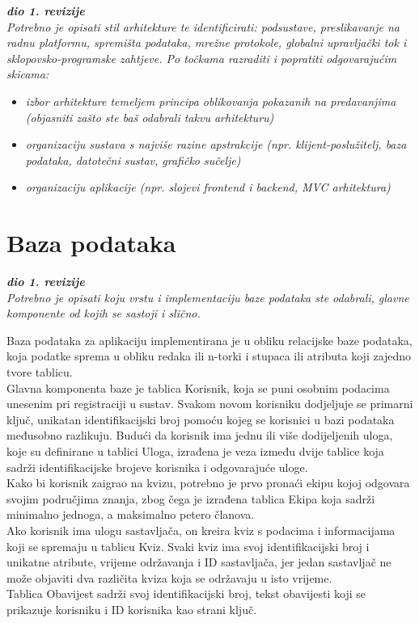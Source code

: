 		
		\textbf{\textit{dio 1. revizije}}\\

		\textit{ Potrebno je opisati stil arhitekture te identificirati: podsustave, preslikavanje na radnu platformu, spremišta podataka, mrežne protokole, globalni upravljački tok i sklopovsko-programske zahtjeve. Po točkama razraditi i popratiti odgovarajućim skicama:}
	\begin{itemize}
		\item 	\textit{izbor arhitekture temeljem principa oblikovanja pokazanih na predavanjima (objasniti zašto ste baš odabrali takvu arhitekturu)}
		\item 	\textit{organizaciju sustava s najviše razine apstrakcije (npr. klijent-poslužitelj, baza podataka, datotečni sustav, grafičko sučelje)}
		\item 	\textit{organizaciju aplikacije (npr. slojevi frontend i backend, MVC arhitektura) }		
	\end{itemize}

	
		

		

				
		\section{Baza podataka}
			
			\textbf{\textit{dio 1. revizije}}\\
			
		\textit{Potrebno je opisati koju vrstu i implementaciju baze podataka ste odabrali, glavne komponente od kojih se sastoji i slično.}

		Baza podataka za aplikaciju implementirana je u obliku relacijske baze podataka, koja podatke sprema u obliku redaka ili n-torki i stupaca ili atributa koji zajedno tvore tablicu.  \\
Glavna komponenta baze je tablica Korisnik, koja se puni osobnim podacima unesenim pri registraciji u sustav.  Svakom novom korisniku dodjeljuje se primarni ključ, unikatan identifikacijski broj pomoću kojeg se korisnici u bazi podataka međusobno razlikuju. Budući da korisnik ima jednu ili više dodijeljenih uloga, koje su definirane u tablici Uloga, izrađena je veza između dvije tablice koja sadrži identifikacijske brojeve korisnika i odgovarajuće uloge. \\
Kako bi korisnik zaigrao na kvizu, potrebno je prvo pronaći ekipu kojoj odgovara svojim područjima znanja, zbog čega je izrađena tablica Ekipa koja sadrži minimalno jednoga, a maksimalno petero članova.  \\
Ako korisnik ima ulogu sastavljača, on kreira kviz s podacima i informacijama koji se spremaju u tablicu Kviz.  Svaki kviz ima svoj identifikacijski broj i unikatne atribute, vrijeme održavanja i ID sastavljača, jer jedan sastavljač ne može objaviti dva različita kviza koja se održavaju u isto vrijeme.  \\
Tablica Obavijest sadrži svoj identifikacijski broj, tekst obavijesti koji se prikazuje korisniku i ID korisnika kao strani ključ. \\

